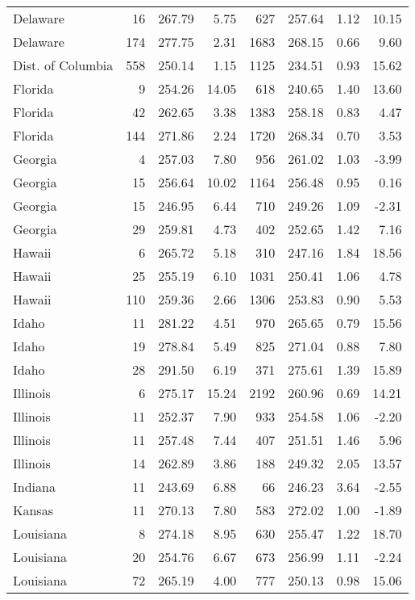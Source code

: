 \begin{longtable}{lrrr@{\extracolsep{10pt}}rrrr}
  Delaware &  16 & 267.79 & 5.75 & 627 & 257.64 & 1.12 & 10.15 \\ 
  Delaware & 174 & 277.75 & 2.31 & 1683 & 268.15 & 0.66 & 9.60 \\ 
  Dist. of Columbia & 558 & 250.14 & 1.15 & 1125 & 234.51 & 0.93 & 15.62 \\ 
  Florida &   9 & 254.26 & 14.05 & 618 & 240.65 & 1.40 & 13.60 \\ 
  Florida &  42 & 262.65 & 3.38 & 1383 & 258.18 & 0.83 & 4.47 \\ 
  Florida & 144 & 271.86 & 2.24 & 1720 & 268.34 & 0.70 & 3.53 \\ 
  Georgia &   4 & 257.03 & 7.80 & 956 & 261.02 & 1.03 & -3.99 \\ 
  Georgia &  15 & 256.64 & 10.02 & 1164 & 256.48 & 0.95 & 0.16 \\ 
  Georgia &  15 & 246.95 & 6.44 & 710 & 249.26 & 1.09 & -2.31 \\ 
  Georgia &  29 & 259.81 & 4.73 & 402 & 252.65 & 1.42 & 7.16 \\ 
  Hawaii &   6 & 265.72 & 5.18 & 310 & 247.16 & 1.84 & 18.56 \\ 
  Hawaii &  25 & 255.19 & 6.10 & 1031 & 250.41 & 1.06 & 4.78 \\ 
  Hawaii & 110 & 259.36 & 2.66 & 1306 & 253.83 & 0.90 & 5.53 \\ 
  Idaho &  11 & 281.22 & 4.51 & 970 & 265.65 & 0.79 & 15.56 \\ 
  Idaho &  19 & 278.84 & 5.49 & 825 & 271.04 & 0.88 & 7.80 \\ 
  Idaho &  28 & 291.50 & 6.19 & 371 & 275.61 & 1.39 & 15.89 \\ 
  Illinois &   6 & 275.17 & 15.24 & 2192 & 260.96 & 0.69 & 14.21 \\ 
  Illinois &  11 & 252.37 & 7.90 & 933 & 254.58 & 1.06 & -2.20 \\ 
  Illinois &  11 & 257.48 & 7.44 & 407 & 251.51 & 1.46 & 5.96 \\ 
  Illinois &  14 & 262.89 & 3.86 & 188 & 249.32 & 2.05 & 13.57 \\ 
  Indiana &  11 & 243.69 & 6.88 &  66 & 246.23 & 3.64 & -2.55 \\ 
  Kansas &  11 & 270.13 & 7.80 & 583 & 272.02 & 1.00 & -1.89 \\ 
  Louisiana &   8 & 274.18 & 8.95 & 630 & 255.47 & 1.22 & 18.70 \\ 
  Louisiana &  20 & 254.76 & 6.67 & 673 & 256.99 & 1.11 & -2.24 \\ 
  Louisiana &  72 & 265.19 & 4.00 & 777 & 250.13 & 0.98 & 15.06 \\ 

\end{longtable}
